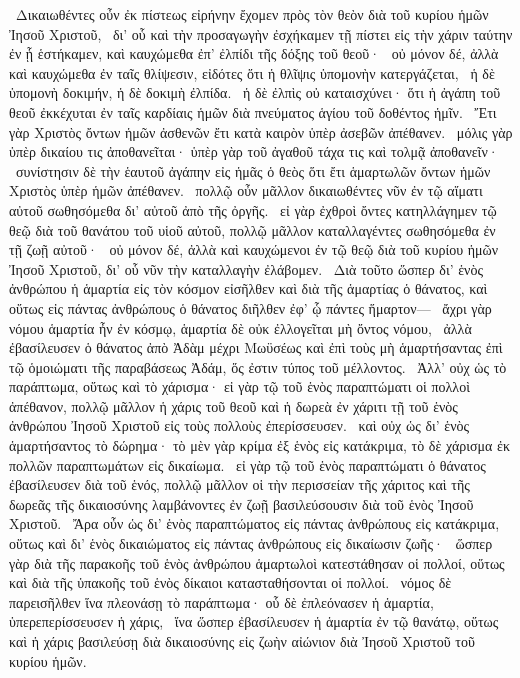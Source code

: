 ~Δικαιωθέντες οὖν ἐκ πίστεως εἰρήνην ἔχομεν πρὸς τὸν θεὸν διὰ τοῦ κυρίου ἡμῶν Ἰησοῦ Χριστοῦ,
~δι’ οὗ καὶ τὴν προσαγωγὴν ἐσχήκαμεν τῇ πίστει εἰς τὴν χάριν ταύτην ἐν ᾗ ἑστήκαμεν, καὶ καυχώμεθα ἐπ’ ἐλπίδι τῆς δόξης τοῦ θεοῦ·
~οὐ μόνον δέ, ἀλλὰ καὶ καυχώμεθα ἐν ταῖς θλίψεσιν, εἰδότες ὅτι ἡ θλῖψις ὑπομονὴν κατεργάζεται,
~ἡ δὲ ὑπομονὴ δοκιμήν, ἡ δὲ δοκιμὴ ἐλπίδα.
~ἡ δὲ ἐλπὶς οὐ καταισχύνει· ὅτι ἡ ἀγάπη τοῦ θεοῦ ἐκκέχυται ἐν ταῖς καρδίαις ἡμῶν διὰ πνεύματος ἁγίου τοῦ δοθέντος ἡμῖν.
~Ἔτι γὰρ Χριστὸς ὄντων ἡμῶν ἀσθενῶν ἔτι κατὰ καιρὸν ὑπὲρ ἀσεβῶν ἀπέθανεν.
~μόλις γὰρ ὑπὲρ δικαίου τις ἀποθανεῖται· ὑπὲρ γὰρ τοῦ ἀγαθοῦ τάχα τις καὶ τολμᾷ ἀποθανεῖν·
~συνίστησιν δὲ τὴν ἑαυτοῦ ἀγάπην εἰς ἡμᾶς ὁ θεὸς ὅτι ἔτι ἁμαρτωλῶν ὄντων ἡμῶν Χριστὸς ὑπὲρ ἡμῶν ἀπέθανεν.
~πολλῷ οὖν μᾶλλον δικαιωθέντες νῦν ἐν τῷ αἵματι αὐτοῦ σωθησόμεθα δι’ αὐτοῦ ἀπὸ τῆς ὀργῆς.
~εἰ γὰρ ἐχθροὶ ὄντες κατηλλάγημεν τῷ θεῷ διὰ τοῦ θανάτου τοῦ υἱοῦ αὐτοῦ, πολλῷ μᾶλλον καταλλαγέντες σωθησόμεθα ἐν τῇ ζωῇ αὐτοῦ·
~οὐ μόνον δέ, ἀλλὰ καὶ καυχώμενοι ἐν τῷ θεῷ διὰ τοῦ κυρίου ἡμῶν Ἰησοῦ Χριστοῦ, δι’ οὗ νῦν τὴν καταλλαγὴν ἐλάβομεν.
~Διὰ τοῦτο ὥσπερ δι’ ἑνὸς ἀνθρώπου ἡ ἁμαρτία εἰς τὸν κόσμον εἰσῆλθεν καὶ διὰ τῆς ἁμαρτίας ὁ θάνατος, καὶ οὕτως εἰς πάντας ἀνθρώπους ὁ θάνατος διῆλθεν ἐφ’ ᾧ πάντες ἥμαρτον—
~ἄχρι γὰρ νόμου ἁμαρτία ἦν ἐν κόσμῳ, ἁμαρτία δὲ οὐκ ἐλλογεῖται μὴ ὄντος νόμου,
~ἀλλὰ ἐβασίλευσεν ὁ θάνατος ἀπὸ Ἀδὰμ μέχρι Μωϋσέως καὶ ἐπὶ τοὺς μὴ ἁμαρτήσαντας ἐπὶ τῷ ὁμοιώματι τῆς παραβάσεως Ἀδάμ, ὅς ἐστιν τύπος τοῦ μέλλοντος.
~Ἀλλ’ οὐχ ὡς τὸ παράπτωμα, οὕτως καὶ τὸ χάρισμα· εἰ γὰρ τῷ τοῦ ἑνὸς παραπτώματι οἱ πολλοὶ ἀπέθανον, πολλῷ μᾶλλον ἡ χάρις τοῦ θεοῦ καὶ ἡ δωρεὰ ἐν χάριτι τῇ τοῦ ἑνὸς ἀνθρώπου Ἰησοῦ Χριστοῦ εἰς τοὺς πολλοὺς ἐπερίσσευσεν.
~καὶ οὐχ ὡς δι’ ἑνὸς ἁμαρτήσαντος τὸ δώρημα· τὸ μὲν γὰρ κρίμα ἐξ ἑνὸς εἰς κατάκριμα, τὸ δὲ χάρισμα ἐκ πολλῶν παραπτωμάτων εἰς δικαίωμα.
~εἰ γὰρ τῷ τοῦ ἑνὸς παραπτώματι ὁ θάνατος ἐβασίλευσεν διὰ τοῦ ἑνός, πολλῷ μᾶλλον οἱ τὴν περισσείαν τῆς χάριτος καὶ τῆς δωρεᾶς τῆς δικαιοσύνης λαμβάνοντες ἐν ζωῇ βασιλεύσουσιν διὰ τοῦ ἑνὸς Ἰησοῦ Χριστοῦ.
~Ἄρα οὖν ὡς δι’ ἑνὸς παραπτώματος εἰς πάντας ἀνθρώπους εἰς κατάκριμα, οὕτως καὶ δι’ ἑνὸς δικαιώματος εἰς πάντας ἀνθρώπους εἰς δικαίωσιν ζωῆς·
~ὥσπερ γὰρ διὰ τῆς παρακοῆς τοῦ ἑνὸς ἀνθρώπου ἁμαρτωλοὶ κατεστάθησαν οἱ πολλοί, οὕτως καὶ διὰ τῆς ὑπακοῆς τοῦ ἑνὸς δίκαιοι κατασταθήσονται οἱ πολλοί.
~νόμος δὲ παρεισῆλθεν ἵνα πλεονάσῃ τὸ παράπτωμα· οὗ δὲ ἐπλεόνασεν ἡ ἁμαρτία, ὑπερεπερίσσευσεν ἡ χάρις,
~ἵνα ὥσπερ ἐβασίλευσεν ἡ ἁμαρτία ἐν τῷ θανάτῳ, οὕτως καὶ ἡ χάρις βασιλεύσῃ διὰ δικαιοσύνης εἰς ζωὴν αἰώνιον διὰ Ἰησοῦ Χριστοῦ τοῦ κυρίου ἡμῶν.

